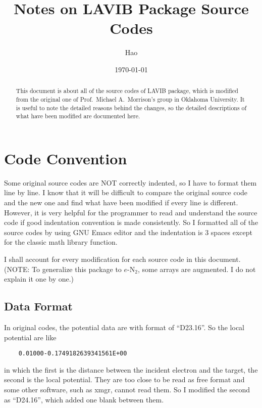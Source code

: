 \documentclass[aps,pra,groupedaddress,
                amsfonts,amssymb,
                preprint
    ]{revtex4}
\begin{document}
%
\date{\today}
%
\title[LAVIB SOURCE]
{Notes on LAVIB Package Source Codes}

\author{Hao }

\begin{abstract}
  This document is about all of the source codes of LAVIB package, which
  is modified from the original one of Prof.~Michael A.~Morrison's group
  in Oklahoma University. It is useful to note the detailed reasons
  behind the changes, so the detailed descriptions of what have been
  modified are documented here.
\end{abstract}

\maketitle
\tableofcontents

\section{Code Convention}
\label{sec:code-convention}
Some original source codes are NOT correctly indented, so I have to
format them line by line. I know that it will be difficult to compare
the original source code and the new one and find what have been
modified if every line is different. However, it is very helpful for the
programmer to read and understand the source code if good indentation
convention is made consistently. So I formatted all of the source codes
by using GNU Emacs editor and the indentation is 3 spaces except for the
classic math library function. 

I shall account for every modification for each source code in this
document. (NOTE: To generalize this package to $e$-N$_2$, some arrays
are augmented. I do not explain it one by one.)

\subsection{Data Format}
\label{sec:data-format}
In original codes, the potential data are with format of ``D23.16''. So
the local potential are like
\begin{verbatim}
    0.01000-0.1749182639341561E+00
\end{verbatim}
in which the first is the distance between the incident electron and the
target, the second is the local potential. They are too close to be read
as free format and some other software, such as xmgr, cannot read them.
So I modified the second as ``D24.16'', which added one blank between
them.
\end{document}
